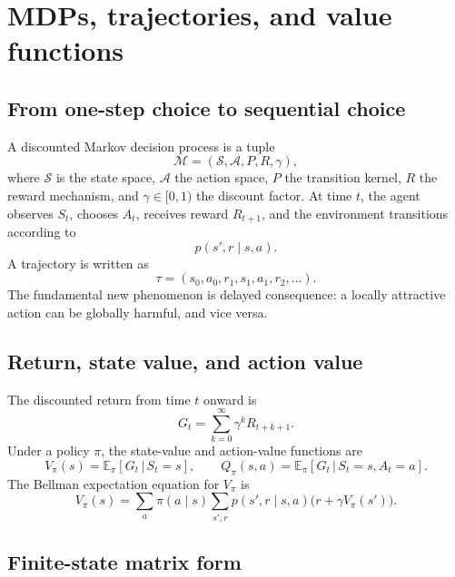 \documentclass[11pt]{article}
\newcommand{\E}{\mathbb{E}}
\newcommand{\1}{\mathbf{1}}
\newcommand{\given}{\,|\,}
\begin{document}
\section{MDPs, trajectories, and value functions}

\subsection{From one-step choice to sequential choice}

A discounted Markov decision process is a tuple
\begin{equation}
\mathcal M=(\mathcal S,\mathcal A,P,R,\gamma),
\end{equation}
where $\mathcal S$ is the state space, $\mathcal A$ the action space, $P$ the transition kernel, $R$ the reward mechanism, and $\gamma\in[0,1)$ the discount factor. At time $t$, the agent observes $S_t$, chooses $A_t$, receives reward $R_{t+1}$, and the environment transitions according to
\begin{equation}
p(s',r\mid s,a).
\end{equation}
A trajectory is written as
\begin{equation}
\tau=(s_0,a_0,r_1,s_1,a_1,r_2,\dots).
\end{equation}
The fundamental new phenomenon is delayed consequence: a locally attractive action can be globally harmful, and vice versa.

\subsection{Return, state value, and action value}

The discounted return from time $t$ onward is
\begin{equation}
G_t = \sum_{k=0}^{\infty}\gamma^k R_{t+k+1}.
\end{equation}
Under a policy $\pi$, the state-value and action-value functions are
\begin{equation}
V_\pi(s)=\E_\pi[G_t\given S_t=s],
\qquad
Q_\pi(s,a)=\E_\pi[G_t\given S_t=s,A_t=a].
\end{equation}
The Bellman expectation equation for $V_\pi$ is
\begin{equation}
V_\pi(s)=\sum_a \pi(a\mid s)\sum_{s',r} p(s',r\mid s,a)\bigl(r+\gamma V_\pi(s')\bigr).
\end{equation}

\subsection{Finite-state matrix form}
\end{document}

